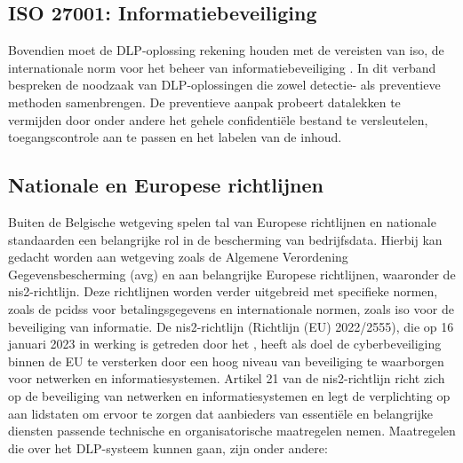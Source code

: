 \subsection{ISO 27001: Informatiebeveiliging}%
\label{sec:iso-literatuurstudie}

Bovendien moet de DLP-oplossing rekening houden met de vereisten van \gls{iso}, de internationale norm voor het beheer van informatiebeveiliging \autocite{ISO2022}. 
In dit verband bespreken \textcite{Alsanabani2020} de noodzaak van DLP-oploss\-ingen die zowel detectie- als preventieve methoden samenbrengen. 
De preventieve aanpak probeert datalekken te vermijden door onder andere het gehele confidentiële bestand te versleutelen, toegangscontrole aan te passen en het labelen van de inhoud.

\subsection{Nationale en Europese richtlijnen}%
\label{sec:nationale-europese-richtlijnen-literatuurstudie}

Buiten de Belgische wetgeving spelen tal van Europese richtlijnen en nationale standaarden een belangrijke rol in de bescherming van bedrijfsdata.
Hierbij kan gedacht worden aan wetgeving zoals de Algemene Verordening Gegevensbescherming (\gls{avg}) en aan belangrijke Europese richtlijnen, waaronder de \gls{nis2}-richtlijn. 
Deze richtlijnen worden verder uitgebreid met specifieke normen, zoals de \gls{pcidss} voor betalingsgegevens en internationale normen, zoals \gls{iso} voor de beveiliging van informatie. 
De \gls{nis2}-richtlijn (Richtlijn (EU) 2022/2555), die op 16 januari 2023 in werking is getreden door het \textcite{nis2directive}, 
heeft als doel de cyberbeveiliging binnen de EU te versterken door een hoog niveau van beveiliging te waarborgen voor netwerken en informatiesystemen. 
Artikel 21 van de \gls{nis2}-richtlijn richt zich op de beveiliging van netwerken en informatiesystemen en legt de verplichting op aan lidstaten om 
ervoor te zorgen dat aanbieders van essentiële en belangrijke diensten passende technische en organisatorische maatregelen nemen. 
Maatregelen die over het DLP-systeem kunnen gaan, zijn onder andere: 


